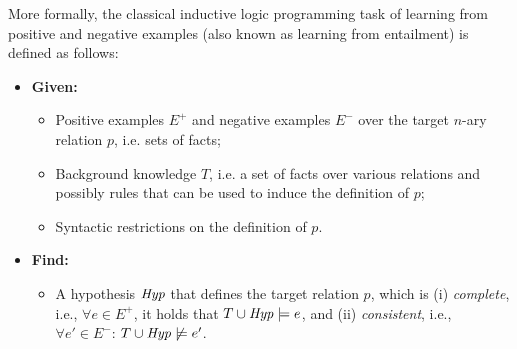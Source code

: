 More formally, the classical inductive logic programming task of learning from positive and negative examples (also known as learning from entailment)
is defined as follows:
\begin{definition}\label{def:learnex}
\begin{itemize}
\item[] \textbf{Given:}
\begin{itemize}
\item Positive examples $E^+$ and negative examples $E^-$ over the target $n$-ary relation $p$, i.e. sets of facts;
\item Background knowledge $T$, i.e. a set of facts over various relations and possibly rules that can be used to induce the definition of $p$; 
\item Syntactic restrictions on the definition of $p$.
\end{itemize}
\smallskip

\item[] \textbf{Find:}
\begin{itemize}
\item A hypothesis $\mathit{Hyp}$ that defines the target relation $p$, which is (i) \emph{complete}, i.e., $\forall e\in E^+$, it holds that $T \cup \mathit{Hyp} \models e$, and (ii) \emph{consistent}, i.e., $\forall e' \in E^-$: $T \cup \mathit{Hyp} \not \models e'$.
\end{itemize}
\end{itemize}
\end{definition}


